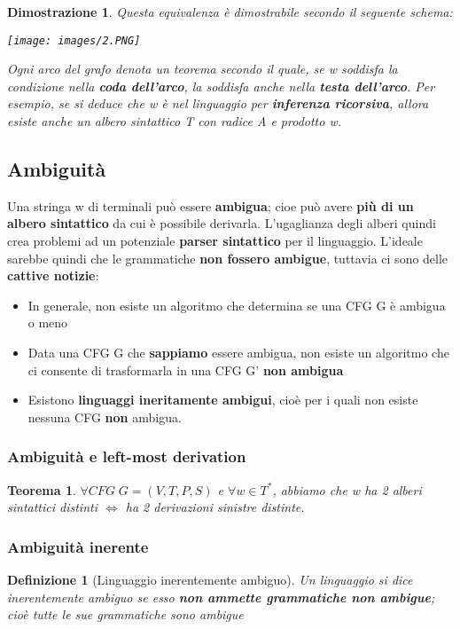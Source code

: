 \documentclass[12pt]{article}
\newtheorem{Definizione}{Definizione}[subsection]
\newtheorem{Teorema}{Teorema}[subsection]
\newtheorem{Dimostrazione}{Dimostrazione}[subsection]
\begin{document}
\begin{Dimostrazione}
    Questa equivalenza è dimostrabile secondo il seguente schema:
    \begin{center}
        \texttt{[image: images/2.PNG]}
    \end{center}
    Ogni arco del grafo denota un teorema secondo il quale, se w soddisfa la condizione nella \textbf{coda dell'arco}, la soddisfa anche nella \textbf{testa dell'arco}. Per esempio, se si deduce che w è nel linguaggio per \textbf{inferenza ricorsiva}, allora esiste anche un albero sintattico T con radice A e prodotto w.
\end{Dimostrazione}
\subsection{Ambiguità}
Una stringa w di terminali può essere \textbf{ambigua}; cioe può avere \textbf{più di un albero sintattico} da cui è possibile derivarla. L'ugaglianza degli alberi quindi crea problemi ad un potenziale \textbf{parser sintattico} per il linguaggio. L'ideale sarebbe quindi che le grammatiche \textbf{non fossero ambigue}, tuttavia ci sono delle \textbf{cattive notizie}:
\begin{itemize}
    \item In generale, non esiste un algoritmo che determina se una CFG G è ambigua o meno
    \item Data una CFG G che \textbf{sappiamo} essere ambigua, non esiste un algoritmo che ci consente di trasformarla
    in una CFG G' \textbf{non ambigua}
    \item Esistono \textbf{linguaggi ineritamente ambigui}, cioè per i quali non esiste nessuna CFG \textbf{non} ambigua.
\end{itemize}\subsubsection{Ambiguità e left-most derivation}
\begin{Teorema}
    $\forall CFG \; G = (V, T, P, S)$ e $\forall w \in T^*$, abbiamo che w ha 2 alberi sintattici distinti $\Leftrightarrow$ ha 2 derivazioni sinistre distinte.
\end{Teorema}
\subsubsection{Ambiguità inerente}
\begin{Definizione}[Linguaggio inerentemente ambiguo]
Un linguaggio si dice inerentemente ambiguo se esso \textbf{non ammette grammatiche non ambigue}; cioè tutte le sue grammatiche sono ambigue
\end{Definizione}
\newpage
\end{document}
